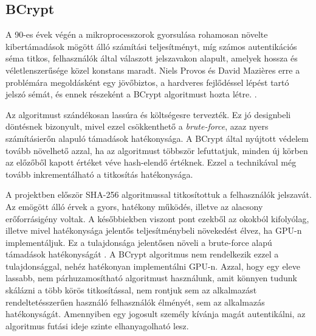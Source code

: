 \subsection{BCrypt}

A 90-es évek végén a mikroprocesszorok gyorsulása rohamosan növelte kibertámadások mögött álló számítási teljesítményt, míg számos autentikációs séma titkos, felhasználók által válaszott jelszavakon alapult, amelyek hossza és véletlenszerűsége közel konstans maradt. Niels Provos és David Mazières erre a problémára megoldásként egy jövőbiztos, a hardveres fejlődéssel lépést tartó jelszó sémát, és ennek részeként a BCrypt algoritmust hozta létre. \cite{provos1999future}. \par

Az algoritmust szándékosan lassúra és költségesre tervezték. Ez jó designbeli döntésnek bizonyult, mivel ezzel csökkenthető a \emph{brute-force}, azaz nyers számításierőn alapuló támadások hatékonysága. A BCrypt által nyújtott védelem tovább növelhető azzal, ha az algoritmust többször lefuttatjuk, minden új körben az előzőből kapott értéket véve hash-elendő értéknek. Ezzel a technikával még tovább inkrementálható a titkosítás hatékonysága. \par

A projektben először SHA-256 algoritmussal titkosítottuk a felhasználók jelszavát. Az emögött álló érvek a gyors, hatékony működés, illetve az alacsony erőforrásigény voltak. A későbbiekben viszont pont ezekből az okokból kifolyólag, illetve mivel hatékonysága jelentős teljesítménybeli növekedést élvez, ha GPU-n implementáljuk. Ez a tulajdonsága jelentősen növeli a brute-force alapú támadások hatékonyságát \cite{patra2021cryptography}. A BCrypt algoritmus nem rendelkezik ezzel a tulajdonsággal, nehéz hatékonyan implementálni GPU-n. Azzal, hogy egy eleve lassabb, nem párhuzamosítható algoritmust használunk, amit könnyen tudunk skálázni a több körös titkosítással, nem rontjuk sem az alkalmazást rendeltetésszerűen használó felhasználók élményét, sem az alkalmazás hatékonyságát. Amennyiben egy jogosult személy kívánja magát autentikálni, az algoritmus futási ideje szinte elhanyagolható lesz. \par